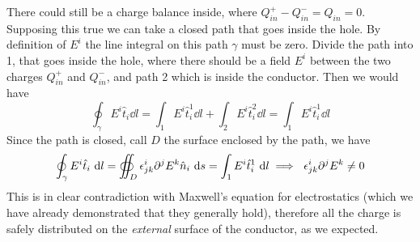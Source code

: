 \documentclass[../electromagnetism]{subfiles}
\begin{document}
There could still be a charge balance inside, where $Q_{in}^+-Q_{in}^-=Q_{in}=0$. Supposing this true we can take a closed path that goes inside the hole. By definition of $E^i$ the line integral on this path $\gamma$ must be zero. Divide the path into 1, that goes inside the hole, where there should be a field $E^i$ between the two charges $Q_{in}^+$ and $Q_{in}^-$, and path 2 which is inside the conductor. Then we would have
\begin{equation*}
	\oint_\gamma E^i\hat{t}_i\dd l=\int_1E^i\hat{t}_i^1\dd l+\int_2E^i\hat{t}_i^2\dd l=\int_1E^i\hat{t}^1_i\dd l
\end{equation*}
Since the path is closed, call $D$ the surface enclosed by the path, we have
\begin{equation}
	\oint_\gamma E^i\hat{t}_i\ \mathrm{d} l=\oiint_D\epsilon^i_{jk}\partial^jE^k\hat{n}_i\ \mathrm{d} s=\int_1E^i\hat{t}^1_i\ \mathrm{d} l\implies\ \epsilon^i_{jk}\partial^jE^k\ne0
	\label{eq:contradictioncond}
\end{equation}
This is in clear contradiction with Maxwell's equation for electrostatics (which we have already demonstrated that they generally hold), therefore all the charge is safely distributed on the \textit{external} surface of the conductor, as we expected.
\end{document}
